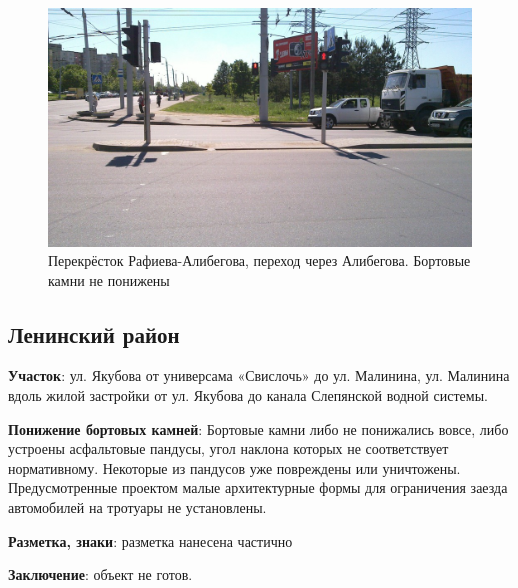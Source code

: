 \documentclass[a4paper,14pt,twoside]{extarticle}
\renewcommand\emph[1]{\textbf{#1}}
\begin{document}
\begin{figure}[h!]
    \centering
    \includegraphics[width=\textwidth]{Pictures/1000000000000A00000005A0BE0179A9.jpg}
    \caption{Перекрёсток Рафиева-Алибегова, переход через Алибегова. Бортовые камни не понижены}
\end{figure}

\clearpage
\newpage

\subsection*{Ленинский район}%
\emph{Участок}: ул. Якубова от универсама «Свислочь» до ул. Малинина, ул. Малинина вдоль жилой застройки от ул. Якубова до канала Слепянской водной системы.

\emph{Понижение бортовых камней}:
Бортовые камни либо не понижались вовсе, либо устроены асфальтовые пандусы, угол наклона которых не соответствует нормативному. Некоторые из пандусов уже повреждены или уничтожены. Предусмотренные проектом малые архитектурные формы для ограничения заезда автомобилей на тротуары не установлены.

\emph{Разметка, знаки}: разметка нанесена частично

\emph{Заключение}: объект не готов.

\clearpage
\end{document}
